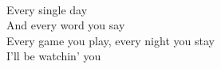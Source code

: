 \\
Every single day \\
And every word you say \\
Every game you play, every night you stay \\
I'll be watchin' you \\
